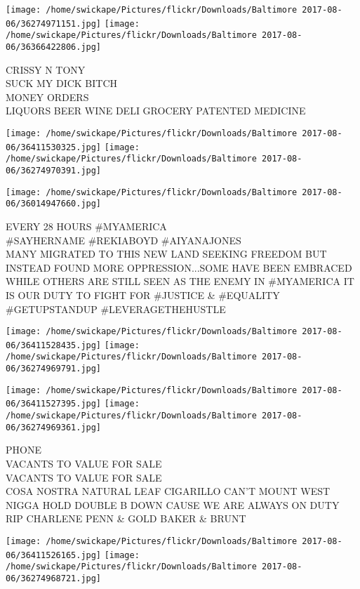 \documentclass[10pt,letterpaper]{article}
\begin{document}
\texttt{[image: /home/swickape/Pictures/flickr/Downloads/Baltimore 2017-08-06/36274971151.jpg]}
\texttt{[image: /home/swickape/Pictures/flickr/Downloads/Baltimore 2017-08-06/36366422806.jpg]}

CRISSY N TONY\\
SUCK MY DICK BITCH\\
MONEY ORDERS\\
LIQUORS BEER WINE DELI GROCERY PATENTED MEDICINE
\pagebreak

\texttt{[image: /home/swickape/Pictures/flickr/Downloads/Baltimore 2017-08-06/36411530325.jpg]}
\texttt{[image: /home/swickape/Pictures/flickr/Downloads/Baltimore 2017-08-06/36274970391.jpg]}

\vspace{0.25in}
\texttt{[image: /home/swickape/Pictures/flickr/Downloads/Baltimore 2017-08-06/36014947660.jpg]}

EVERY 28 HOURS \#MYAMERICA\\
\#SAYHERNAME \#REKIABOYD \#AIYANAJONES\\
MANY MIGRATED TO THIS NEW LAND SEEKING FREEDOM BUT INSTEAD FOUND MORE OPPRESSION...SOME HAVE BEEN EMBRACED WHILE OTHERS ARE STILL SEEN AS THE ENEMY IN \#MYAMERICA IT IS OUR DUTY TO FIGHT FOR \#JUSTICE \& \#EQUALITY \#GETUPSTANDUP \#LEVERAGETHEHUSTLE
\pagebreak

\texttt{[image: /home/swickape/Pictures/flickr/Downloads/Baltimore 2017-08-06/36411528435.jpg]}
\texttt{[image: /home/swickape/Pictures/flickr/Downloads/Baltimore 2017-08-06/36274969791.jpg]}

\texttt{[image: /home/swickape/Pictures/flickr/Downloads/Baltimore 2017-08-06/36411527395.jpg]}
\texttt{[image: /home/swickape/Pictures/flickr/Downloads/Baltimore 2017-08-06/36274969361.jpg]}

PHONE\\
VACANTS TO VALUE FOR SALE\\
VACANTS TO VALUE FOR SALE\\
COSA NOSTRA NATURAL LEAF CIGARILLO CAN'T MOUNT WEST NIGGA HOLD DOUBLE B DOWN CAUSE WE ARE ALWAYS ON DUTY RIP CHARLENE PENN \& GOLD BAKER \& BRUNT
\pagebreak

\texttt{[image: /home/swickape/Pictures/flickr/Downloads/Baltimore 2017-08-06/36411526165.jpg]}
\texttt{[image: /home/swickape/Pictures/flickr/Downloads/Baltimore 2017-08-06/36274968721.jpg]}
\end{document}
